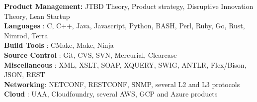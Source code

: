\documentclass[
]{article}
\newcommand{\LR}[1]{\beginL #1\endL}
\begin{document}
\LR{\textbf{Product Management:} JTBD Theory, Product strategy,
Disruptive Innovation Theory, Lean Startup\\
\textbf{Languages} : C, C++, Java, Javascript, Python, BASH, Perl, Ruby,
Go, Rust, Nimrod, Terra\\
\textbf{Build Tools} : CMake, Make, Ninja\\
\textbf{Source Control} : Git, CVS, SVN, Mercurial, Clearcase\\
\textbf{Miscellaneous} : XML, XSLT, SOAP, XQUERY, SWIG, ANTLR,
Flex/Bison, JSON, REST\\
\textbf{Networking}: NETCONF, RESTCONF, SNMP, several L2 and L3
protocols\\
\textbf{Cloud} : UAA, Cloudfoundry, several AWS, GCP and Azure products}
\end{document}
